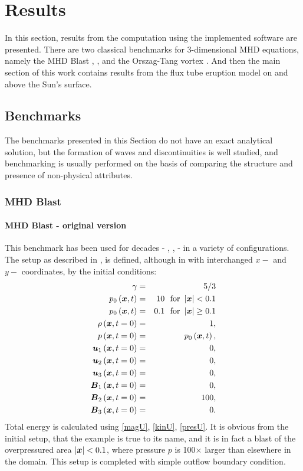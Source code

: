 \chapter{Results}
In this section, results from the computation using the implemented software are presented. There are two classical benchmarks for 3-dimensional MHD equations, namely the MHD Blast \cite{blast1}, \cite{blast2}, and the Orszag-Tang vortex \cite{vortex}. And then the main section of this work contains results from the flux tube eruption model on and above the Sun's surface.

\section{Benchmarks}
The benchmarks presented in this Section do not have an exact analytical solution, but the formation of waves and discontinuities is well studied, and benchmarking is usually performed on the basis of comparing the structure and presence of non-physical attributes.
\subsection{MHD Blast}
\subsubsection{MHD Blast - original version}
This benchmark has been used for decades - \cite{blast0}, \cite{blast1}, \cite{blast2} - in a variety of configurations. The setup as described in \cite{blast0}, \cite{blast1} is defined, although in \cite{blast1} with interchanged $x-$ and $y-$ coordinates, by the initial conditions:
\begin{eqnarray}
\label{mhdBlastOld}
\gamma & = & 5 / 3\\ \nonumber
p_0\left(\mbox{\boldmath $x$}, t\right) & = & 10\ \ \text{for}\ \left|\mbox{\boldmath $x$}\right| < 0.1\\ \nonumber
p_0\left(\mbox{\boldmath $x$}, t\right) & = & 0.1\ \ \text{for}\ \left|\mbox{\boldmath $x$}\right| \geq 0.1\\ \nonumber
\rho\left(\mbox{\boldmath $x$}, t = 0\right) & = & 1,\\ \nonumber
p\left(\mbox{\boldmath $x$}, t = 0\right) & = & p_0\left(\mbox{\boldmath $x$}, t\right),\\ \nonumber
\mbox{\boldmath $u$}_1\left(\mbox{\boldmath $x$}, t = 0\right) & = & 0,\\ \nonumber
\mbox{\boldmath $u$}_2\left(\mbox{\boldmath $x$}, t = 0\right) & = & 0,\\ \nonumber
\mbox{\boldmath $u$}_3\left(\mbox{\boldmath $x$}, t = 0\right) & = & 0,\\ \nonumber
\mbox{\boldmath $B$}_1\left(\mbox{\boldmath $x$}, t = 0\right) & = & 0,\\ \nonumber
\mbox{\boldmath $B$}_2\left(\mbox{\boldmath $x$}, t = 0\right) & = & 100,\\ \nonumber
\mbox{\boldmath $B$}_3\left(\mbox{\boldmath $x$}, t = 0\right) & = & 0.
\end{eqnarray}
Total energy is calculated using \ref{magU}, \ref{kinU}, \ref{presU}.
It is obvious from the initial setup, that the example is true to its name, and it is in fact a blast of the overpressured area $\left|\mbox{\boldmath $x$}\right| < 0.1$, where pressure $p$ is 100$\times$ larger than elsewhere in the domain. This setup is completed with simple outflow boundary condition.


